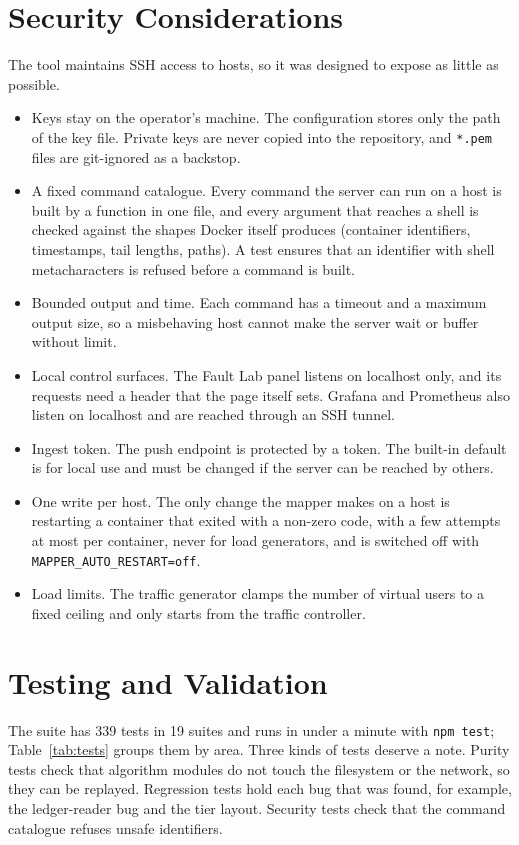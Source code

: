 \section{Security Considerations}
\label{sec:security}
The tool maintains SSH access to hosts, so it was designed to expose as little as possible.
\begin{itemize}
\item Keys stay on the operator's machine. The configuration stores only the path of the key file. Private keys are never copied into the repository, and \texttt{*.pem} files are git-ignored as a backstop.
\item A fixed command catalogue. Every command the server can run on a host is built by a function in one file, and every argument that reaches a shell is checked against the shapes Docker itself produces (container identifiers, timestamps, tail lengths, paths). A test ensures that an identifier with shell metacharacters is refused before a command is built.
\item Bounded output and time. Each command has a timeout and a maximum output size, so a misbehaving host cannot make the server wait or buffer without limit.
\item Local control surfaces. The Fault Lab panel listens on localhost only, and its requests need a header that the page itself sets. Grafana and Prometheus also listen on localhost and are reached through an SSH tunnel.
\item Ingest token. The push endpoint is protected by a token. The built-in default is for local use and must be changed if the server can be reached by others.
\item One write per host. The only change the mapper makes on a host is restarting a container that exited with a non-zero code, with a few attempts at most per container, never for load generators, and is switched off with \texttt{MAPPER\_AUTO\_RESTART=off}.
\item Load limits. The traffic generator clamps the number of virtual users to a fixed ceiling and only starts from the traffic controller.
\end{itemize}

\section{Testing and Validation}
\label{sec:testing}
The suite has 339 tests in 19 suites and runs in under a minute with \texttt{npm test}; Table~\ref{tab:tests} groups them by area. Three kinds of tests deserve a note. Purity tests check that algorithm modules do not touch the filesystem or the network, so they can be replayed. Regression tests hold each bug that was found, for example, the ledger-reader bug and the tier layout. Security tests check that the command catalogue refuses unsafe identifiers.

